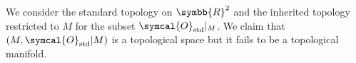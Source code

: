 We consider the standard topology on $\symbb{R}^2$ and the inherited topology restricted to $M$
for the subset $\symcal{O}_{\text{std}}|_M$.
We claim that $(M,\symcal{O}_{\text{std}}|M)$ is a topological space but it fails to be
a topological manifold.

